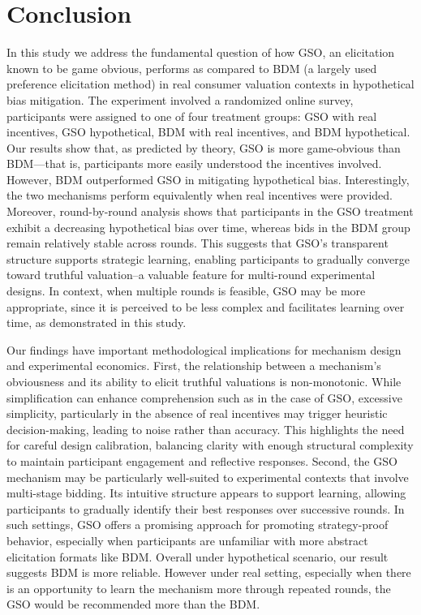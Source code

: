 \documentclass[12pt]{article}
\begin{document}
\section{Conclusion}
\label{Conclusion}

In this study we address the fundamental question of how GSO, an elicitation known to be game obvious, performs as compared to BDM (a largely used preference elicitation method) in real consumer valuation contexts in hypothetical bias mitigation. The experiment involved a randomized online survey, participants were assigned to one of four treatment groups: GSO with real incentives, GSO hypothetical, BDM with real incentives, and BDM hypothetical. Our results show that, as predicted by theory, GSO is more game-obvious than BDM—that is, participants more easily understood the incentives involved. However, BDM outperformed GSO in mitigating hypothetical bias. Interestingly, the two mechanisms perform equivalently when real incentives were provided. Moreover, round-by-round analysis shows that participants in the GSO treatment exhibit a decreasing hypothetical bias over time, whereas bids in the BDM group remain relatively stable across rounds. This suggests that GSO’s transparent structure supports strategic learning, enabling participants to gradually converge toward truthful valuation--a valuable feature for multi-round experimental designs. 
In context, when multiple rounds is feasible, GSO may be more appropriate, since it is perceived to be less complex and facilitates learning over time, as demonstrated in this study. 


Our findings have important methodological implications for mechanism design and experimental economics. First, the relationship between a mechanism’s obviousness and its ability to elicit truthful valuations is non-monotonic. While simplification can enhance comprehension such as in the case of GSO, excessive simplicity, particularly in the absence of real incentives may trigger heuristic decision-making, leading to noise rather than accuracy. This highlights the need for careful design calibration, balancing clarity with enough structural complexity to maintain participant engagement and reflective responses. Second, the GSO mechanism may be particularly well-suited to experimental contexts that involve multi-stage bidding. Its intuitive structure appears to support learning, allowing participants to gradually identify their best responses over successive rounds. In such settings, GSO offers a promising approach for promoting strategy-proof behavior, especially when participants are unfamiliar with more abstract elicitation formats like BDM. Overall under hypothetical scenario, our result suggests BDM is more reliable. However under real setting, especially when there is an opportunity to learn the mechanism more through repeated rounds, the GSO would be recommended more than the BDM. 
\end{document}
